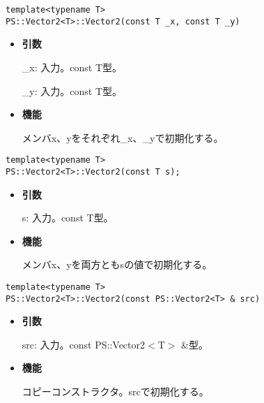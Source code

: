 \begin{screen}
\begin{verbatim}
template<typename T>
PS::Vector2<T>::Vector2(const T _x, const T _y)
\end{verbatim}
\end{screen}

\begin{itemize}

\item{{\bf 引数}}

{\_x}: 入力。{const T}型。

{\_y}: 入力。{const T}型。

\item{{\bf 機能}}

メンバ{x}、{y}をそれぞれ{\_x}、{\_y}で初期化する。

\end{itemize}

\begin{screen}
\begin{verbatim}
template<typename T>
PS::Vector2<T>::Vector2(const T s);
\end{verbatim}
\end{screen}

\begin{itemize}

\item{{\bf 引数}}

{s}: 入力。{const T}型。

\item{{\bf 機能}}

メンバ{x}、{y}を両方とも{s}の値で初期化する。

\end{itemize}


\begin{screen}
\begin{verbatim}
template<typename T>
PS::Vector2<T>::Vector2(const PS::Vector2<T> & src)
\end{verbatim}
\end{screen}

\begin{itemize}

\item{{\bf 引数}}

{src}: 入力。{const PS::Vector2$<$T$>$ \&}型。

\item{{\bf 機能}}

コピーコンストラクタ。{src}で初期化する。

\end{itemize}

